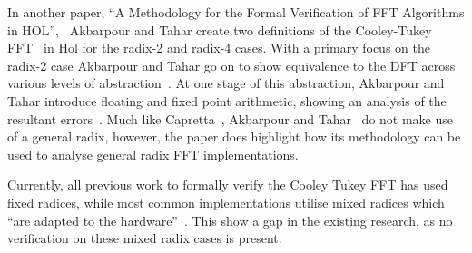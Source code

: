 In another paper, ``A Methodology for the Formal Verification of FFT Algorithms in 
HOL'',~\cite{Akbarpour2004} Akbarpour and Tahar create two definitions of the 
Cooley-Tukey FFT~\cite{Cooley1965} in Hol for the radix-2 and radix-4 cases.
With a primary focus on the radix-2 case Akbarpour and Tahar go on to show 
equivalence to the DFT across various levels of abstraction~\cite{Akbarpour2004}.
At one stage of this abstraction, Akbarpour and Tahar introduce floating and 
fixed point arithmetic, showing an analysis of the resultant errors~\cite{Akbarpour2004}.
Much like Capretta~\cite{Capretta2001}, Akbarpour and Tahar~\cite{Akbarpour2004} 
do not make use of a general radix, however, the paper does highlight how its 
methodology can be used to analyse general radix FFT implementations.

Currently, all previous work to formally verify the Cooley Tukey FFT has used 
fixed radices, while most common implementations utilise mixed radices which 
``are adapted to the hardware''~\cite{Frigo2005}.
This show a gap in the existing research, as no verification on these mixed
radix cases is present.
